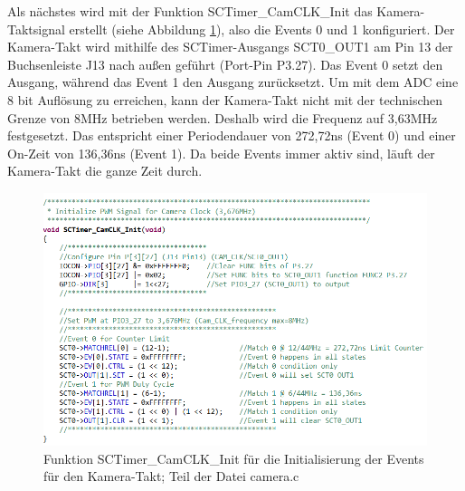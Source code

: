 Als nächstes wird mit der Funktion \glqq{}SCTimer\_CamCLK\_Init\grqq{} das Kamera-Taktsignal erstellt (siehe Abbildung \ref{fig:SCTimerCamCLKInit}), also die Events 0 und 1 konfiguriert. Der Kamera-Takt wird mithilfe des SCTimer-Ausgangs SCT0\_OUT1 am Pin 13 der Buchsenleiste J13 nach außen geführt (Port-Pin P3.27). Das Event 0 setzt den Ausgang, während das Event 1 den Ausgang zurücksetzt. Um mit dem ADC eine 8 bit Auflösung zu erreichen, kann der Kamera-Takt nicht mit der technischen Grenze von 8MHz betrieben werden. Deshalb wird die Frequenz auf 3,63MHz festgesetzt. Das entspricht einer Periodendauer von 272,72ns (Event 0) und einer On-Zeit von 136,36ns (Event 1). Da beide Events immer aktiv sind, läuft der Kamera-Takt die ganze Zeit durch.\vspace{11pt}


\begin{figure}[H] %
\includegraphics[width=.95\textwidth]{sec7/images/code/SCTimerCamCLKInit} 
\centering
\captionsetup{width=.95\textwidth}
\caption[Funktion \glqq{}SCTimer\_CamCLK\_Init\grqq{} aus der Datei \glqq{}camera.c\grqq{}]{Funktion \glqq{}SCTimer\_CamCLK\_Init\grqq{} für die Initialisierung der Events für den Kamera-Takt; Teil der Datei \glqq{}camera.c\grqq{}}\centering
\label{fig:SCTimerCamCLKInit}
\end{figure}


